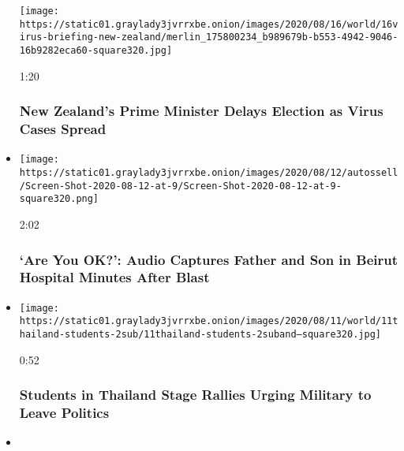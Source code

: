 \begin{itemize}
  \texttt{[image: https://static01.graylady3jvrrxbe.onion/images/2020/08/16/world/16virus-briefing-new-zealand/merlin\_175800234\_b989679b-b553-4942-9046-16b9282eca60-square320.jpg]}

  1:20

  \hypertarget{new-zealands-prime-minister-delays-election-as-virus-cases-spread}{%
  \subsubsection{New Zealand's Prime Minister Delays Election as Virus
  Cases
  Spread}\label{new-zealands-prime-minister-delays-election-as-virus-cases-spread}}
\item
  \href{https://www.nytimes3xbfgragh.onion/video/world/middleeast/100000007285123/beirut-blast-hospital-audio.html?action=click\&module=video-series-bar\&region=header\&pgtype=Article\&playlistId=video/world}{}

  \texttt{[image: https://static01.graylady3jvrrxbe.onion/images/2020/08/12/autossell/Screen-Shot-2020-08-12-at-9/Screen-Shot-2020-08-12-at-9-square320.png]}

  2:02

  \hypertarget{are-you-ok-audio-captures-father-and-son-in-beirut-hospital-minutes-after-blast}{%
  \subsubsection{`Are You OK?': Audio Captures Father and Son in Beirut
  Hospital Minutes After
  Blast}\label{are-you-ok-audio-captures-father-and-son-in-beirut-hospital-minutes-after-blast}}
\item
  \href{https://www.nytimes3xbfgragh.onion/video/us/politics/100000007283595/student-protest-thailand.html?action=click\&module=video-series-bar\&region=header\&pgtype=Article\&playlistId=video/world}{}

  \texttt{[image: https://static01.graylady3jvrrxbe.onion/images/2020/08/11/world/11thailand-students-2sub/11thailand-students-2suband--square320.jpg]}

  0:52

  \hypertarget{students-in-thailand-stage-rallies-urging-military-to-leave-politics}{%
  \subsubsection{Students in Thailand Stage Rallies Urging Military to
  Leave
  Politics}\label{students-in-thailand-stage-rallies-urging-military-to-leave-politics}}
\item
  \href{https://www.nytimes3xbfgragh.onion/video/world/100000007283284/belarus-elections.html?action=click\&module=video-series-bar\&region=header\&pgtype=Article\&playlistId=video/world}{}


\end{itemize}
